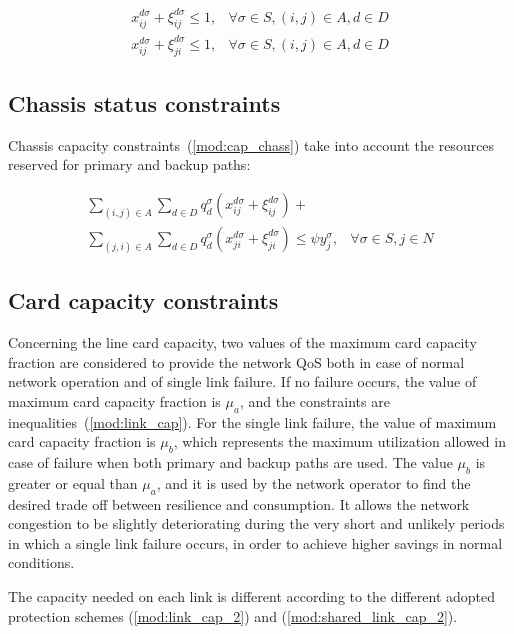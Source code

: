 \documentclass[final,5p,times,twocolumn]{elsarticle}
\begin{document}
\begin{eqnarray}
\label{mod:disjoint_1}x_{ij}^{d \sigma} + \xi_{ij}^{d \sigma} \leq 1, & \forall \sigma \in S, (i,j) \in A, d \in D \\
\label{mod:disjoint_2}
x_{ij}^{d \sigma} + \xi_{ji}^{d \sigma} \leq 1, & \forall \sigma \in S, (i,j) \in A, d \in D 
\end{eqnarray}

\subsection{Chassis status constraints}
Chassis capacity constraints~(\ref{mod:cap_chass}) take into account the resources reserved for primary and backup paths:

\begin{eqnarray}\label{mod:cap_chass}
\sum_{(i,j) \in A}\sum_{d \in D} q_d^{\sigma}\left(x_{ij}^{d \sigma} + \xi_{ij}^{d \sigma}\right)  + & \nonumber \\
\sum_{(j,i) \in A}\sum_{d \in D} q_d^{\sigma} \left(x_{ji}^{d \sigma} + \xi_{ji}^{d \sigma}\right) \leq \psi y_{j}^{\sigma}, & \forall \sigma \in S, j \in N
\end{eqnarray}



\subsection{Card capacity constraints}
Concerning the line card capacity, two values of the maximum card capacity fraction are considered to provide the network QoS both in case of normal network operation and of single link failure.
 If no failure occurs, the value of maximum card capacity fraction is $\mu_a$, and the constraints are inequalities~(\ref{mod:link_cap}). For the single link failure, the value of maximum card capacity fraction is $\mu_b$, which represents the maximum utilization allowed in case of failure when both primary and backup paths are used. The value $\mu_b$ is greater or equal than $\mu_a$, and it is used by the network operator to find the desired trade off between resilience and consumption. It allows the network congestion to be slightly deteriorating during the very short and unlikely periods in which a single link failure occurs, in order to achieve higher savings in normal conditions.

The capacity needed on each link is different according to the different adopted protection schemes (\ref{mod:link_cap_2}) and (\ref{mod:shared_link_cap_2}). 
\end{document}
